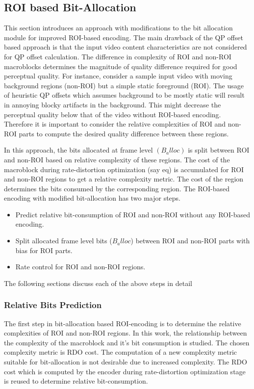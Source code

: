 \documentclass[11pt]{article} %
\begin{document}
\subsection{ROI based Bit-Allocation}
This section introduces an approach with modifications to the bit allocation module for improved ROI-based encoding. The main drawback of the QP offset based approach is that the input video content characteristics are not considered for QP offset calculation. The difference in complexity of ROI and non-ROI macroblocks determines the magnitude of quality difference required for good perceptual quality. For instance, consider a sample input video with moving background regions (non-ROI) but a simple static foreground (ROI). The usage of heuristic QP offsets which assumes background to be mostly static will result in annoying blocky artifacts in the background. This might decrease the perceptual quality below that of the video without ROI-based encoding. Therefore it is important to consider the relative complexities of ROI and non-ROI parts to compute the desired quality difference between these regions.

In this approach, the bits allocated at frame level $(B_alloc)$ is split between ROI and non-ROI based on relative complexity of these regions. The cost of the macroblock during rate-distortion optimization (say eq) is accumulated for ROI and non-ROI regions to get a relative complexity metric. The cost of the region determines the bits consumed by the corresponding region. The ROI-based encoding with modified bit-allocation has two major steps.
\begin{itemize}
	\item Predict relative bit-consumption of ROI and non-ROI without any ROI-based encoding.
	\item Split allocated frame level bits ($B_alloc$) between ROI and non-ROI parts with bias for ROI parts.
	\item Rate control for ROI and non-ROI regions.
\end{itemize}
The following sections discuss each of the above steps in detail
\subsubsection{Relative Bits Prediction}
The first step in bit-allocation based ROI-encoding is to determine the relative complexities of ROI and non-ROI regions. In this work, the relationship between the complexity of the macroblock and it's bit consumption is studied. The chosen complexity metric is RDO cost. The computation of a new complexity metric suitable for bit-allocation is not desirable due to increased complexity. The RDO cost which is computed by the encoder during rate-distortion optimization stage is reused to determine relative bit-consumption.
\end{document}
